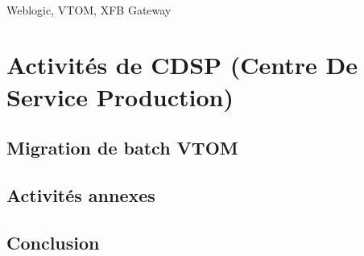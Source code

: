 \documentclass[a4paper,12pt]{report}
\begin{document}
	\paragraph*{}
	Weblogic, VTOM, XFB Gateway 
	
\newpage	
\section{Activités de CDSP (Centre De Service Production)}
	\subsection{Migration de batch VTOM}
	\paragraph*{}
	
	
	\subsection{Activités annexes}
	\paragraph*{}
	
	
\newpage	
\begin{center}
\section*{Conclusion}
\end{center}
\paragraph*{}
\end{document}
